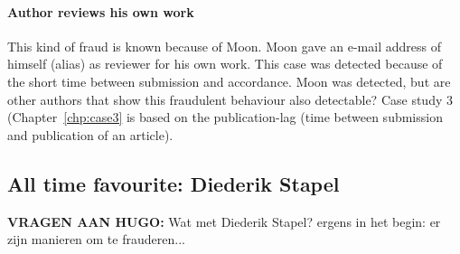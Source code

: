 \documentclass{ou-report}
\newcommand{\todo}[1]{{\color{red} TODO: #1}}
\newcommand{\vraag}[1]{{\color{teal} {\textbf{VRAGEN AAN HUGO: }}#1}}
\newcommand{\outline}[1]{{\color{blue} #1}}
\begin{document}
\paragraph{Author reviews his own work}
This kind of fraud is known because of Moon. Moon gave an e-mail address of 
himself (alias) as reviewer for his own work. This case was detected because of
the short time between submission and accordance. Moon was detected, but are 
other authors that show this fraudulent behaviour also detectable?
Case study 3 (Chapter~\ref{chp:case3} is based on the publication-lag (time 
between submission and publication of an article).















\subsection{All time favourite: Diederik Stapel}
\vraag{Wat met Diederik Stapel?}
\outline{ergens in het begin: er zijn manieren om te frauderen...}
\end{document}

